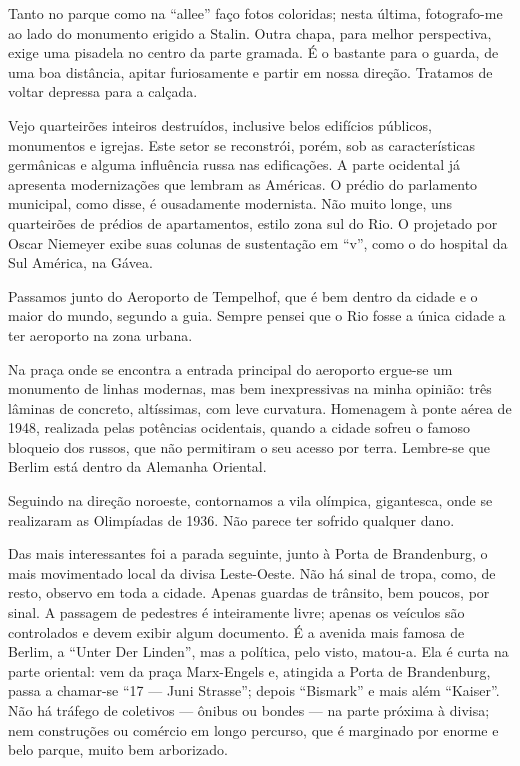 Tanto no parque como na ``allee'' faço fotos coloridas; nesta última, fotografo-me ao lado do monumento erigido a Stalin. Outra chapa, para melhor perspectiva, exige uma pisadela no centro da parte gramada. É o bastante para o guarda, de uma boa distância, apitar furiosamente e partir em nossa direção. Tratamos de voltar depressa para a calçada.

Vejo quarteirões inteiros destruídos, inclusive belos edifícios públicos, monumentos e igrejas. Este setor se reconstrói, porém, sob as características germânicas e alguma influência russa nas edificações. A parte ocidental já apresenta modernizações que lembram as Américas. O prédio do parlamento municipal, como disse, é ousadamente modernista. Não muito longe, uns quarteirões de prédios de apartamentos, estilo zona sul do Rio. O projetado por Oscar Niemeyer exibe suas colunas de sustentação em ``v'', como o do hospital da Sul América, na Gávea.

Passamos junto do Aeroporto de Tempelhof, que é bem dentro da cidade e o maior do mundo, segundo a guia. Sempre pensei que o Rio fosse a única cidade a ter aeroporto na zona urbana.

Na praça onde se encontra a entrada principal do aeroporto ergue-se um monumento de linhas modernas, mas bem inexpressivas na minha opinião: três lâminas de concreto, altíssimas, com leve curvatura. Homenagem à ponte aérea de 1948, realizada pelas potências ocidentais, quando a cidade sofreu o famoso bloqueio dos russos, que não permitiram o seu acesso por terra. Lembre-se que Berlim está dentro da Alemanha Oriental.

Seguindo na direção noroeste, contornamos a vila olímpica, gigantesca, onde se realizaram as Olimpíadas de 1936. Não parece ter sofrido qualquer dano.

Das mais interessantes foi a parada seguinte, junto à Porta de Brandenburg, o mais movimentado local da divisa Leste-Oeste. Não há sinal de tropa, como, de resto, observo em toda a cidade. Apenas guardas de trânsito, bem poucos, por sinal. A passagem de pedestres é inteiramente livre; apenas os veículos são controlados e devem exibir algum documento. É a avenida mais famosa de Berlim, a ``Unter Der Linden'', mas a política, pelo visto, matou-a. Ela é curta na parte oriental: vem da praça Marx-Engels e, atingida a Porta de Brandenburg, passa a chamar-se ``17 --- Juni Strasse''; depois ``Bismark'' e mais além ``Kaiser''. Não há tráfego de coletivos --- ônibus ou bondes --- na parte próxima à divisa; nem construções ou comércio em longo percurso, que é marginado por enorme e belo parque, muito bem arborizado.

